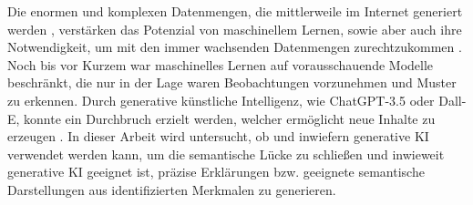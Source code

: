 \par

\noindent
Die enormen und komplexen Datenmengen, die mittlerweile im Internet generiert werden \cite{global-mobile-data-usage}, verstärken das Potenzial von maschinellem Lernen, sowie aber auch ihre Notwendigkeit, um mit den immer wachsenden Datenmengen zurechtzukommen \cite{mckinsey-generative-ai}.
Noch bis vor Kurzem war maschinelles Lernen auf vorausschauende Modelle beschränkt, die nur in der Lage waren Beobachtungen vorzunehmen und Muster zu erkennen.
Durch generative künstliche Intelligenz, wie ChatGPT-3.5 oder Dall-E, konnte ein Durchbruch erzielt werden, welcher ermöglicht neue Inhalte zu erzeugen \cite{mckinsey-generative-ai}.
\med
In dieser Arbeit wird untersucht, ob und inwiefern generative KI verwendet werden kann, um die semantische Lücke zu schließen und inwieweit generative KI geeignet ist, präzise Erklärungen bzw. geeignete semantische Darstellungen aus identifizierten Merkmalen zu generieren.

